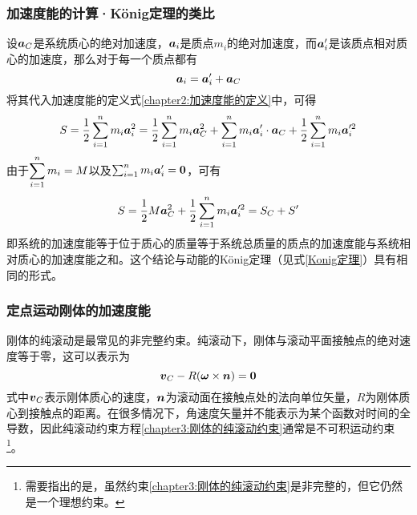 \subsubsection{加速度能的计算·K\"onig定理的类比}

设$\boldsymbol{a}_C$是系统质心的绝对加速度，$\boldsymbol{a}_i$是质点$m_i$的绝对加速度，而$\boldsymbol{a}_i'$是该质点相对质心的加速度，那么对于每一个质点都有
\begin{equation}
	\boldsymbol{a}_i = \boldsymbol{a}_i'+\boldsymbol{a}_C
\end{equation}
将其代入加速度能的定义式\eqref{chapter2:加速度能的定义}中，可得
\begin{equation}
	S = \frac12 \sum_{i=1}^n m_i\boldsymbol{a}_i^2 = \frac12 \sum_{i=1}^n m_i\boldsymbol{a}_C^2 + \sum_{i=1}^n m_i\boldsymbol{a}_i' \cdot \boldsymbol{a}_C + \frac12 \sum_{i=1}^n m_i\boldsymbol{a}_i'^2
\end{equation}
由于$\displaystyle \sum_{i=1}^n m_i = M$以及$\sum_{i=1}^n m_i\boldsymbol{a}_i' = \boldsymbol{0}$，可有
\begin{equation}
	S = \frac12 M\boldsymbol{a}_C^2 + \frac12 \sum_{i=1}^n m_i\boldsymbol{a}_i'^2 = S_C+S'
	\label{chapter3:加速度能的柯尼希定理}
\end{equation}
即系统的加速度能等于位于质心的质量等于系统总质量的质点的加速度能与系统相对质心的加速度能之和。这个结论与动能的K\"onig定理（见式\eqref{Konig定理}）具有相同的形式。

\subsubsection{定点运动刚体的加速度能}

刚体的纯滚动是最常见的非完整约束。纯滚动下，刚体与滚动平面接触点的绝对速度等于零，这可以表示为
\begin{equation}
	\boldsymbol{v}_C-R(\boldsymbol{\omega}\times \boldsymbol{n}) = \boldsymbol{0}
	\label{chapter3:刚体的纯滚动约束}
\end{equation}
式中$\boldsymbol{v}_C$表示刚体质心的速度，$\boldsymbol{n}$为滚动面在接触点处的法向单位矢量，$R$为刚体质心到接触点的距离。在很多情况下，角速度矢量并不能表示为某个函数对时间的全导数，因此纯滚动约束方程\eqref{chapter3:刚体的纯滚动约束}通常是不可积运动约束\footnote{需要指出的是，虽然约束\eqref{chapter3:刚体的纯滚动约束}是非完整的，但它仍然是一个理想约束。}。

